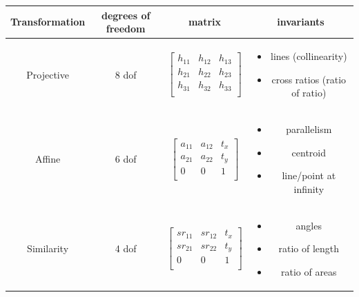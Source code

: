 \begin{tabular}{|c|c|c|c|}
 \hline
  Transformation & degrees of freedom & matrix & invariants \\
  \hline
  Projective & 8 dof & 
  $\left[\begin{array}{ccc}
       h_{11}&h_{12}&h_{13}  \\
       h_{21}&h_{22}&h_{23}  \\
       h_{31}&h_{32}&h_{33}  \\
    \end{array}\right]$ & 
    \begin{minipage}[t]{0.4\textwidth}
    \begin{itemize}
        \item lines (collinearity)  
        \item cross ratios (ratio of ratio)
    \end{itemize}
    \end{minipage}
    \\
    \hline
    
      Affine & 6 dof & 
  $\left[\begin{array}{ccc}
       a_{11}&a_{12}&t_{x}  \\
       a_{21}&a_{22}&t_{y}  \\
       0 & 0 & 1  \\
    \end{array}\right]$ & 
    \begin{minipage}[t]{0.4\textwidth}
    \begin{itemize}
        \item parallelism
        \item centroid
        \item line/point at infinity
    \end{itemize}
    \end{minipage}
    \\
    \hline
    
    Similarity & 4 dof & 
  $\left[\begin{array}{ccc}
       sr_{11}&sr_{12}&t_{x}  \\
       sr_{21}&sr_{22}&t_{y}  \\
       0 & 0 & 1  \\
    \end{array}\right]$ & 
    \begin{minipage}[t]{0.4\textwidth}
    \begin{itemize}
        \item angles
        \item ratio of length
        \item ratio of areas
    \end{itemize}
    \end{minipage}
    \\
    \hline
    

\end{tabular}
